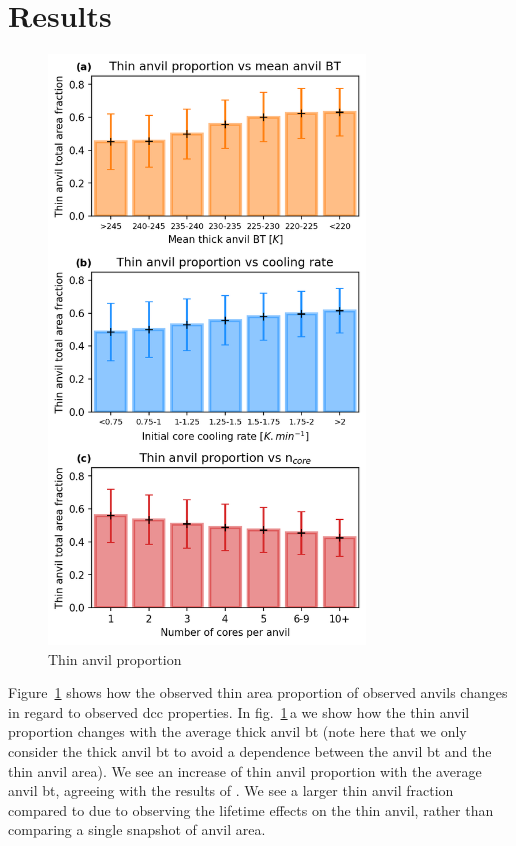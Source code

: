 \section{Results}

\begin{figure}[tp]
    \centering
    \includegraphics[width=0.75\textwidth]{figures/ch2_20.png}
    \caption{Thin anvil proportion}
    \label{fig:thin_anvil_proportion}
\end{figure}

Figure~\ref{fig:thin_anvil_proportion} shows how the observed thin area proportion of observed anvils changes in regard to observed \acrshort{dcc} properties.
In fig.~\ref{fig:thin_anvil_proportion}\,a we show how the thin anvil proportion changes with the average thick anvil \acrshort{bt} (note here that we only consider the thick anvil \acrshort{bt} to avoid a dependence between the anvil \acrshort{bt} and the thin anvil area).
We see an increase of thin anvil proportion with the average anvil \acrshort{bt}, agreeing with the results of \citet{protopapadaki_upper_2017}.
We see a larger thin anvil fraction compared to \citet{protopapadaki_upper_2017} due to observing the lifetime effects on the thin anvil, rather than comparing a single snapshot of anvil area.

